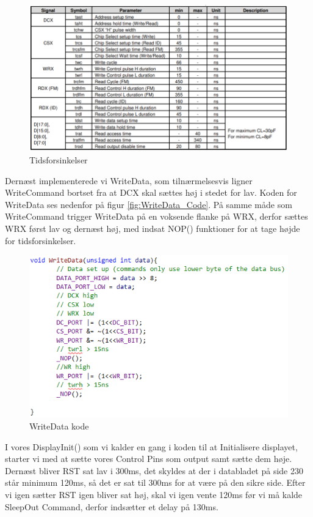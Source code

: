 \begin{figure}[H]
	\centering
	\includegraphics[width = 450pt]{Img/Timedelays.png}
	\caption{Tidsforsinkelser}
	\label{fig:Timedelays}
\end{figure}


Dernæst implementerede vi WriteData, som tilnærmelsesvis ligner WriteCommand bortset fra at DCX skal sættes høj i stedet for lav. Koden for WriteData ses nedenfor på figur \autoref{fig:WriteData_Code}. På samme måde som WriteCommand trigger WriteData på en voksende flanke på WRX, derfor sættes WRX først lav og dernæst høj, med indsat NOP() funktioner for at tage højde for tidsforsinkelser. 

\begin{figure}[H]
	\centering
	\includegraphics[width = 350pt]{Img/WriteData_Code.png}
	\caption{WriteData kode}
	\label{fig:WriteData_Code}
\end{figure}


I vores DisplayInit() som vi kalder en gang i koden til at Initialisere displayet, starter vi med at sætte vores Control Pins som output samt sætte dem høje. Dernæst bliver RST sat lav i 300ms, det skyldes at der i databladet på side 230 står minimum 120ms, så det er sat til 300ms for at være på den sikre side. Efter vi igen sætter RST igen bliver sat høj, skal vi igen vente 120ms før vi må kalde SleepOut Command, derfor indsætter et delay på 130ms. 

